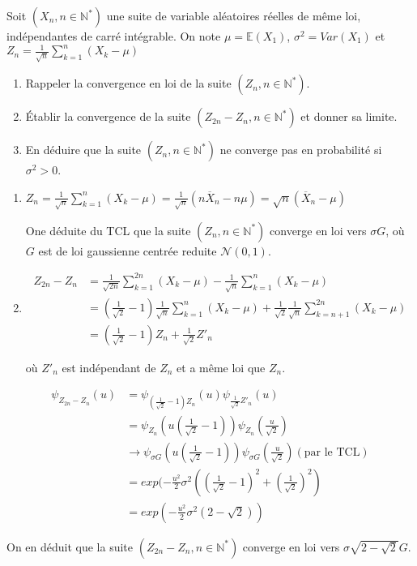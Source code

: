 \documentclass[10pt,a4paper,oneside]{article}
\newenvironment{exercice}[1][Exercice]{\begin{trivlist}
\item[\hskip \labelsep {\bfseries #1}]}{\end{trivlist}}
\newenvironment{solution}[1][Solution]{\begin{trivlist}
\item[\hskip \labelsep {\bfseries #1}]}{\end{trivlist}}
\begin{document}
\begin{exercice}
Soit $(X_n,n \in \mathbb{N}^*)$ une suite de variable aléatoires réelles de même loi, indépendantes de carré intégrable. On note $\mu = \mathbb{E}(X_1)$, $\sigma^2 = Var(X_1)$ et $Z_n = \frac{1}{\sqrt{n}}\sum_{k = 1}^n(X_k - \mu)$

\begin{enumerate}
\item
Rappeler la convergence en loi de la suite $(Z_n,n \in \mathbb{N}^*)$.

\item
Établir la convergence de la suite $(Z_{2n} - Z_n,n \in \mathbb{N}^*)$ et donner sa limite.

\item
En déduire que la suite $(Z_n,n \in \mathbb{N}^*)$ ne converge pas en probabilité si $\sigma^2 > 0$.
\end{enumerate}

\end{exercice}


\begin{solution}

\begin{enumerate}
\item
$Z_n = \frac{1}{\sqrt{n}}\sum_{k = 1}^n(X_k - \mu) = \frac{1}{\sqrt{n}}(n\overline{X}_n - n \mu) = \sqrt{n}(\overline{X}_n - \mu)$

One déduite du TCL que la suite $(Z_n,n \in \mathbb{N}^*)$ converge en loi vers $\sigma G$, où $G$ est de loi gaussienne centrée reduite $\mathcal{N}(0,1)$.

\item
\begin{align}
Z_{2n} - Z_n &= \frac{1}{\sqrt{2n}} \sum_{k = 1}^{2n}(X_k-\mu) - \frac{1}{\sqrt{n}} \sum_{k = 1}^n(X_k-\mu) \nonumber \\
&= (\frac{1}{\sqrt{2}} - 1)\frac{1}{\sqrt{n}} \sum_{k = 1}^n(X_k-\mu) + \frac{1}{\sqrt{2}} \frac{1}{\sqrt{n}} \sum_{k = n + 1}^{2n}(X_k-\mu) \nonumber \\
&= (\frac{1}{\sqrt{2}} - 1)Z_n + \frac{1}{\sqrt{2}}Z'_n \nonumber
\end{align}

où $Z'_n$ est indépendant de $Z_n$ et a même loi que $Z_n$.

\end{enumerate}

\end{solution}

\begin{align}
\psi_{Z_{2n} - Z_n}(u) &= \psi_{(\frac{1}{\sqrt{2}} - 1)Z_n}(u) \psi_{\frac{1}{\sqrt{2}}Z'_n}(u) \nonumber \\
&= \psi_{Z_n}(u(\frac{1}{\sqrt{2}} - 1)) \psi_{Z_n}(\frac{u}{\sqrt{2}}) \nonumber \\
&\to \psi_{\sigma G}(u(\frac{1}{\sqrt{2}} - 1)) \psi_{\sigma G}(\frac{u}{\sqrt{2}}) (\text{par le TCL}) \nonumber \\
&= exp(-\frac{u^2}{2}\sigma^2((\frac{1}{\sqrt{2}} - 1)^2 + (\frac{1}{\sqrt{2}})^2) \nonumber \\
&= exp(-\frac{u^2}{2}\sigma^2(2-\sqrt{2})) \nonumber
\end{align}

On en déduit que la suite $(Z_{2n} - Z_n, n \in \mathbb{N}^*)$ converge en loi vers $\sigma \sqrt{2 - \sqrt{2}} G$.
\end{document}
